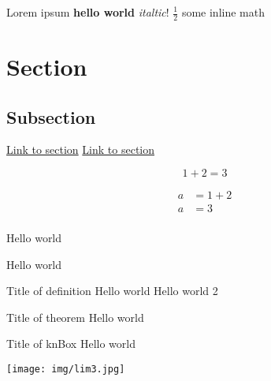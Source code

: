 Lorem ipsum \textbf{hello world} \textit{italtic}! $\frac12$ some inline math %

\section{Section} 

\subsection{Subsection} %

\hyperref[sec:name]{Link to section} %
\hyperref[subsec:name]{Link to section} %

\[1+2=3\] %

\begin{align*}
    a & = 1 + 2 \\
    a & = 3 \\
\end{align*} %

\begin{minipage}{0.5\textwidth}
Hello world
\end{minipage}
\begin{minipage}{0.5\textwidth}
Hello world
\end{minipage} 

\begin{definition}
{Title of definition}
Hello world
\tcblower
Hello world 2
\end{definition}

\begin{theorem}
{Title of theorem}
Hello world
\end{theorem}

\begin{knBox}
{Title of knBox}
Hello world
\end{knBox}

\texttt{[image: img/lim3.jpg]} %